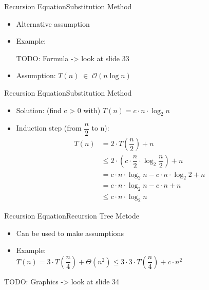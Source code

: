 
\begin{frame}{Recursion Equation}{Substitution Method}
	\begin{itemize}
		\item
			Alternative assumption
		\item
		Example:
		
		TODO: Formula -> look at slide 33 \vspace{2em}
		
		\item
		Assumption: $T(n) \; \in \; \mathcal{O}(n \log n)$
	\end{itemize}
\end{frame}


\begin{frame}{Recursion Equation}{Substitution Method}
	\begin{itemize}
		\item
			Solution: (find c > 0 with) $T(n) = c \cdot n \cdot \log_2 n$
		\item
		Induction step (from $\dfrac{n}{2}$ to n):
		\begin{align*}
		T(n) & = 2 \cdot T\left(\dfrac{n}{2}\right) + n \\
		{} & \leq 2 \cdot \left(c \cdot \dfrac{n}{2} \cdot \log_2 
		\dfrac{n}{2}\right) + n \\
		{} & = c \cdot n \cdot \log_2 n - c \cdot n \cdot \log_2 2 + n\\
		{} & = c \cdot n \cdot \log_2 n - c \cdot n + n\\
		{} & \leq c \cdot n \cdot \log_2 n
		\end{align*}
	\end{itemize}
\end{frame}


\begin{frame}{Recursion Equation}{Recursion Tree Metode}
	\begin{itemize}
		\item
			Can be used to make assumptions
		\item
			Example:\\
			$T(n) = 3 \cdot T\left(\dfrac{n}{4}\right) + \Theta(n^2) \leq 3 \cdot 3 
			\cdot T\left(\dfrac{n}{4}\right) + c \cdot n^2$
	\end{itemize}
	
	TODO: Graphics -> look at slide 34 \vspace{2em}
	
	\end{frame}

